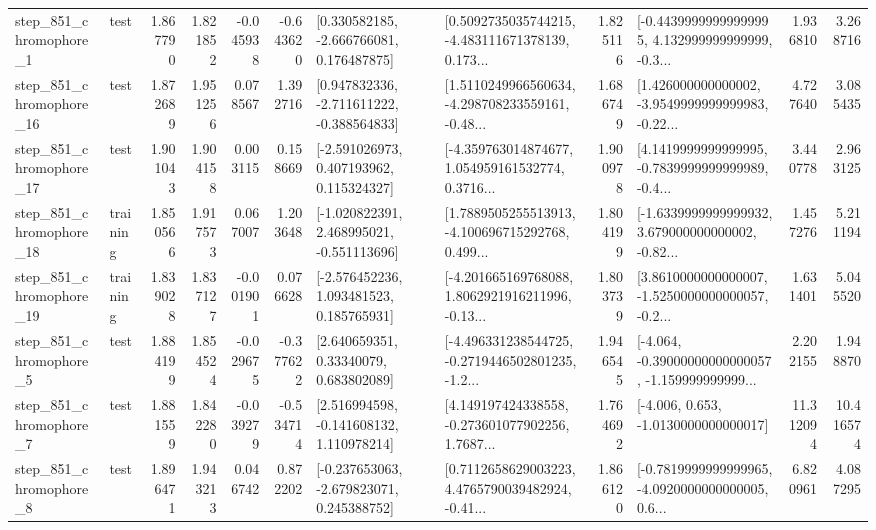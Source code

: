 \begin{tabular}{llrrrrllrlrr}
   step\_851\_chromophore\_1 &      test &      1.867790 &    1.821852 &     -0.045938 & -0.643620 &    [0.330582185, -2.666766081, 0.176487875] &  [0.5092735035744215, -4.483111671378139, 0.173... &       1.825116 &  [-0.44399999999999995, 4.132999999999999, -0.3... &            1.936810 &          3.268716 \\
  step\_851\_chromophore\_16 &      test &      1.872689 &    1.951256 &      0.078567 &  1.392716 &   [0.947832336, -2.711611222, -0.388564833] &  [1.5110249966560634, -4.298708233559161, -0.48... &       1.686749 &  [1.426000000000002, -3.9549999999999983, -0.22... &            4.727640 &          3.085435 \\
  step\_851\_chromophore\_17 &      test &      1.901043 &    1.904158 &      0.003115 &  0.158669 &    [-2.591026973, 0.407193962, 0.115324327] &  [-4.359763014874677, 1.054959161532774, 0.3716... &       1.900978 &  [4.1419999999999995, -0.7839999999999989, -0.4... &            3.440778 &          2.963125 \\
  step\_851\_chromophore\_18 &  training &      1.850566 &    1.917573 &      0.067007 &  1.203648 &   [-1.020822391, 2.468995021, -0.551113696] &  [1.7889505255513913, -4.100696715292768, 0.499... &       1.804199 &  [-1.6339999999999932, 3.679000000000002, -0.82... &            1.457276 &          5.211194 \\
  step\_851\_chromophore\_19 &  training &      1.839028 &    1.837127 &     -0.001901 &  0.076628 &    [-2.576452236, 1.093481523, 0.185765931] &  [-4.201665169768088, 1.8062921916211996, -0.13... &       1.803739 &  [3.8610000000000007, -1.5250000000000057, -0.2... &            1.631401 &          5.045520 \\
   step\_851\_chromophore\_5 &      test &      1.884199 &    1.854524 &     -0.029675 & -0.377622 &      [2.640659351, 0.33340079, 0.683802089] &  [-4.496331238544725, -0.2719446502801235, -1.2... &       1.946545 &  [-4.064, -0.39000000000000057, -1.159999999999... &            2.202155 &          1.948870 \\
   step\_851\_chromophore\_7 &      test &      1.881559 &    1.842280 &     -0.039279 & -0.534714 &    [2.516994598, -0.141608132, 1.110978214] &  [4.149197424338558, -0.273601077902256, 1.7687... &       1.764692 &               [-4.006, 0.653, -1.0130000000000017] &           11.312094 &         10.416574 \\
   step\_851\_chromophore\_8 &      test &      1.896471 &    1.943213 &      0.046742 &  0.872202 &   [-0.237653063, -2.679823071, 0.245388752] &  [0.7112658629003223, 4.4765790039482924, -0.41... &       1.866120 &  [-0.7819999999999965, -4.0920000000000005, 0.6... &            6.820961 &          4.087295 \\

\end{tabular}
